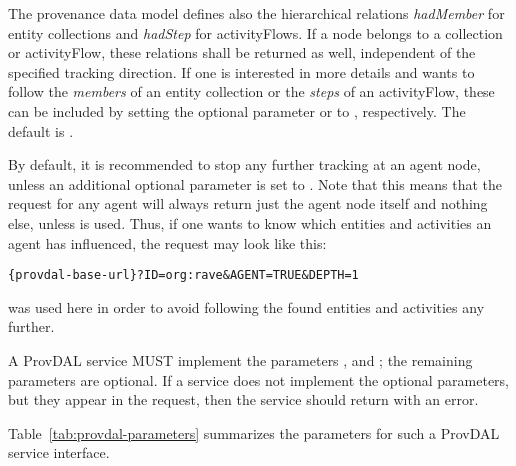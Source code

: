 The provenance data model defines also the hierarchical relations \emph{hadMember} for entity collections and \emph{hadStep} for activityFlows. If a node belongs to a collection or activityFlow, these relations shall be returned as well, independent of the specified tracking direction.
If one is interested in more details and wants to follow the \emph{members} of an entity collection or the \emph{steps} of an activityFlow, these can be included by setting the optional parameter  or  to , respectively. The default is .

By default, it is recommended to stop any further tracking at an agent node, unless an additional optional parameter  is set to . Note that this means that the request for any agent will always return just the agent node itself and nothing else, unless  is used. Thus, if one wants to know which entities and activities an agent has influenced, the request may look like this:

\begin{verbatim}
{provdal-base-url}?ID=org:rave&AGENT=TRUE&DEPTH=1
\end{verbatim}

\noindent
{} was used here in order to avoid following the found entities and activities any further.




A ProvDAL service MUST implement the parameters ,  and ; the remaining parameters are optional.
If a service does not implement the optional parameters, but they appear in the request, then the service should return with an error.

Table~\ref{tab:provdal-parameters} summarizes the parameters for such a ProvDAL service interface.

